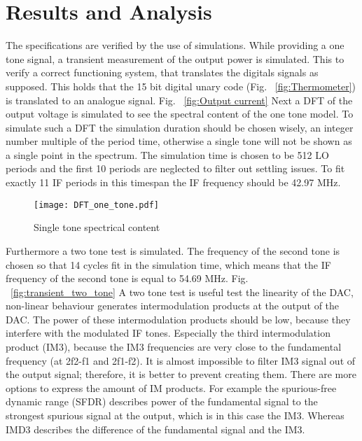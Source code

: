 \section{Results and Analysis}\label{sec:simulations}
The specifications are verified by the use of simulations. While providing a one tone signal, a transient measurement of the output power is simulated. This to verify a correct functioning system, that translates the digitals signals as supposed. This holds that the 15 bit digital unary code (Fig. ~\ref{fig:Thermometer}) is translated to an analogue signal. Fig. ~\ref{fig:Output current}
Next a DFT of the output voltage is simulated to see the spectral content of the one tone model. To simulate such a DFT the simulation duration should be chosen wisely, an integer number multiple of the period time, otherwise a single tone will not be shown as a single point in the spectrum. The simulation time is chosen to be 512 LO periods and the first 10 periods are neglected to filter out settling issues. To fit exactly 11 IF periods in this timespan the IF frequency should be 42.97 MHz.
\begin{figure}[htp] 
\texttt{[image: DFT\_one\_tone.pdf]}
\caption{Single tone spectrical content}
\label{fig:transient_single_tone}
\end{figure}
Furthermore a two tone test is simulated. The frequency of the second tone is chosen so that 14 cycles fit in the simulation time, which means that the IF frequency of the second tone is equal to 54.69 MHz.  Fig. ~\ref{fig:transient_two_tone} A two tone test is useful test the linearity of the DAC, non-linear behaviour generates intermodulation products at the output of the DAC. The power of these intermodulation products should be low, because they interfere with the modulated IF tones. Especially the third intermodulation product (IM3), because the IM3 frequencies are very close to the fundamental frequency (at 2f2-f1 and 2f1-f2). It is almost impossible to filter IM3 signal out of the output signal; therefore, it is better to prevent creating them. There are more options to express the amount of IM products. For example the spurious-free dynamic range (SFDR) describes power of the fundamental signal to the strongest spurious signal at the output, which is in this case the IM3. Whereas IMD3 describes the difference of the fundamental signal and the IM3.
